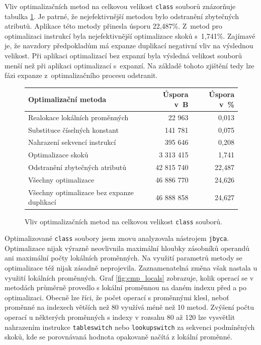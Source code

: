 Vliv optimalizačních metod na celkovou velikost \texttt{class} souborů znázorňuje tabulka \ref{tab:sizes}. Je patrné, že nejefektivnější metodou bylo odstranění zbytečných atributů. Aplikace této metody přinesla úsporu 22,487\%. Z~metod pro optimalizaci instrukcí byla nejefektivnější optimalizace skoků s~1,741\%. Zajímavé je, že navzdory předpokladům má expanze duplikací negativní vliv na výslednou velikost. Při aplikaci optimalizací bez expanzí byla výsledná velikost souborů menší než při aplikaci optimalizací s~expanzí. Na základě tohoto zjištění tedy lze fázi expanze z~optimalizačního procesu odstranit.

\begin{figure}
\begin{center}
  \begin{tabular}{l r r} \hline

\textbf{Optimalizační metoda}	&	\textbf{Úspora v~B}	&	\textbf{Úspora v~\%}	\\\hline
Realokace lokálních proměnných					&	22 963	&			0,013	\\
Substituce číselných konstant					&	141 781	&			0,075	\\
Nahrazení sekvencí instrukcí					&	395 646	&			0,208	\\
Optimalizace skoků					&	3 313 415	&			1,741	\\
Odstranění zbytečných atributů			&	42 815 740			&	22,487			\\
Všechny optimalizace			&	46 886 770			&	24,626			\\
Všechny optimalizace bez expanze duplikací			&	46 888 858			&	24,627			\\\hline

  \end{tabular}
\end{center}
\caption{Vliv optimalizačních metod na celkovou velikost \texttt{class} souborů.}
\label{tab:sizes}
\end{figure}
          
Optimalizované \texttt{class} soubory jsem znovu analyzovala nástrojem \texttt{jbyca}. Optimalizace nijak výrazně neovlivnila maximální hloubky zásobníků operandů ani maximální počty lokálních proměnných. Na využití parametrů metody se optimalizace též nijak zásadně neprojevila. Zaznamenatelná změna však nastala u využití lokálních proměnných. Graf \ref{fig:cmp_locals} zobrazuje, kolik operací se v metodách průměrně provedlo s lokální proměnnou na daném indexu před a po optimalizaci. Obecně lze říci, že počet operací s proměnnými klesl, neboť proměnné na indexech větších než 80 využívá méně než 10 metod. Zvýšení počtu operací u některých proměnných s indexy v rozsahu 80 až 120 lze vysvětlit nahrazením instrukce \texttt{tableswitch} nebo \texttt{lookupswitch} za sekvenci podmíněných skoků, kde se porovnávaná hodnota opakovaně načítá z lokální proměnné. 

